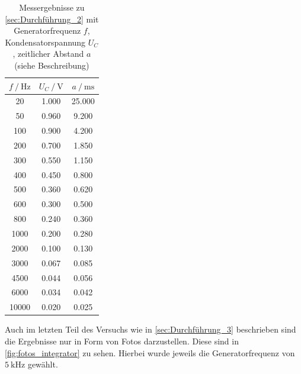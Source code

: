 \begin{table}
    \centering
    \caption{Messergebnisse zu \autoref{sec:Durchführung_2} mit Generatorfrequenz $f$, Kondensatorspannung $U_C$, zeitlicher Abstand $a$ (siehe Beschreibung)}
    \label{tab:gemessen}
    \begin{tabular}{c c c}
        \toprule
        $f \:/\: \si{\hertz}$ & $U_C \:/\: \si{\volt}$ & $a \:/\: \si{\milli\second}$ \\
        \midrule
        20 & 1.000 & 25.000 \\
        50 & 0.960 & 9.200 \\
        100 & 0.900 & 4.200 \\
        200 & 0.700 & 1.850 \\
        300 & 0.550 & 1.150 \\
        400 & 0.450 & 0.800 \\
        500 & 0.360 & 0.620 \\
        600 & 0.300 & 0.500 \\
        800 & 0.240 & 0.360 \\
        1000 & 0.200 & 0.280 \\
        2000 & 0.100 & 0.130 \\
        3000 & 0.067 & 0.085 \\
        4500 & 0.044 & 0.056 \\
        6000 & 0.034 & 0.042 \\
        10000 & 0.020 & 0.025 \\
        \bottomrule
    \end{tabular}
\end{table}

Auch im letzten Teil des Versuchs wie in \autoref{sec:Durchführung_3} beschrieben sind die Ergebnisse nur in Form von Fotos darzustellen. Diese sind in \autoref{fig:fotos_integrator} zu sehen. Hierbei wurde jeweils die Generatorfrequenz von $\SI{5}{\kilo\hertz}$ gewählt.


